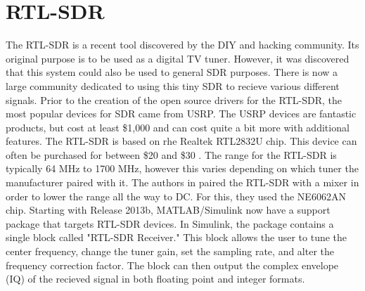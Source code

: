 \section{RTL-SDR}

	The RTL-SDR is a recent tool discovered by the DIY and hacking community. Its original purpose is to be used as a digital
	TV tuner. However, it was discovered that this system could also be used to general SDR purposes. There is now a large 
	community dedicated to using this tiny SDR to recieve various different signals. Prior to the creation of the open source
	drivers for the RTL-SDR, the most popular devices for SDR came from USRP. The USRP devices are fantastic products, but cost
	at least \$1,000 and can cost quite a bit more with additional features. The RTL-SDR is based on rhe Realtek RTL2832U chip.
	This device can often be purchased for between \$20 and \$30 \cite{6526525}. The range for the RTL-SDR is typically 64 MHz
	to 1700 MHz, however this varies depending on which tuner the manufacturer paired with it. The authors in \cite{6526525} 
	paired the RTL-SDR with a mixer in order to lower the range all the way to DC. For this, they used the NE6062AN chip.  
	Starting with Release 2013b, MATLAB/Simulink now have a support package that targets RTL-SDR devices. In Simulink, the
	package contains a single block called "RTL-SDR Receiver." This block allows the user to tune the center frequency, 
	change the tuner gain, set the sampling rate, and alter the frequency correction factor. The block can then output
	the complex envelope (IQ) of the recieved signal in both floating point and integer formats\cite{6893337}. 
	
	 
